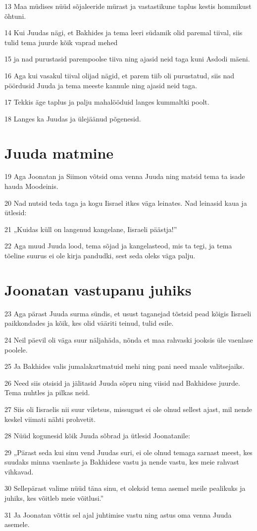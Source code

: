 \par 13 Maa müdises nüüd sõjaleeride mürast ja vastastikune taplus kestis hommikust õhtuni.
\par 14 Kui Juudas nägi, et Bakhides ja tema leeri südamik olid paremal tiival, siis tulid tema juurde kõik vaprad mehed
\par 15 ja nad purustasid parempoolse tiiva ning ajasid neid taga kuni Asdodi mäeni.
\par 16 Aga kui vasakul tiival olijad nägid, et parem tiib oli purustatud, siis nad pöördusid Juuda ja tema meeste kannule ning ajasid neid taga.
\par 17 Tekkis äge taplus ja palju mahalööduid langes kummaltki poolt.
\par 18 Langes ka Juudas ja ülejäänud põgenesid. 

\section*{Juuda matmine}

\par 19 Aga Joonatan ja Siimon võtsid oma venna Juuda ning matsid tema ta isade hauda Moodeinis.
\par 20 Nad nutsid teda taga ja kogu Iisrael itkes väga leinates. Nad leinasid kaua ja ütlesid:
\par 21 „Kuidas küll on langenud kangelane, Iisraeli päästja!”
\par 22 Aga muud Juuda lood, tema sõjad ja kangelasteod, mis ta tegi, ja tema tõeline suurus ei ole kirja pandudki, sest seda oleks väga palju. 

\section*{Joonatan vastupanu juhiks}

\par 23 Aga pärast Juuda surma sündis, et usust taganejad tõstsid pead kõigis Iisraeli paikkondades ja kõik, kes olid vääriti teinud, tulid esile.
\par 24 Neil päevil oli väga suur näljahäda, nõnda et maa rahvaski jooksis üle vaenlase poolele.
\par 25 Ja Bakhides valis jumalakartmatuid mehi ning pani need maale valitsejaiks.
\par 26 Need siis otsisid ja jälitasid Juuda sõpru ning viisid nad Bakhidese juurde. Tema nuhtles ja pilkas neid.
\par 27 Siis oli Iisraelis nii suur viletsus, missugust ei ole olnud sellest ajast, mil nende keskel viimati nähti prohvetit.
\par 28 Nüüd kogunesid kõik Juuda sõbrad ja ütlesid Joonatanile:
\par 29 „Pärast seda kui sinu vend Juudas suri, ei ole olnud temaga sarnast meest, kes suudaks minna vaenlaste ja Bakhidese vastu ja nende vastu, kes meie rahvast vihkavad.
\par 30 Sellepärast valime nüüd täna sinu, et oleksid tema asemel meile pealikuks ja juhiks, kes võitleb meie võitlusi.”
\par 31 Ja Joonatan võttis sel ajal juhtimise vastu ning astus oma venna Juuda asemele. 

